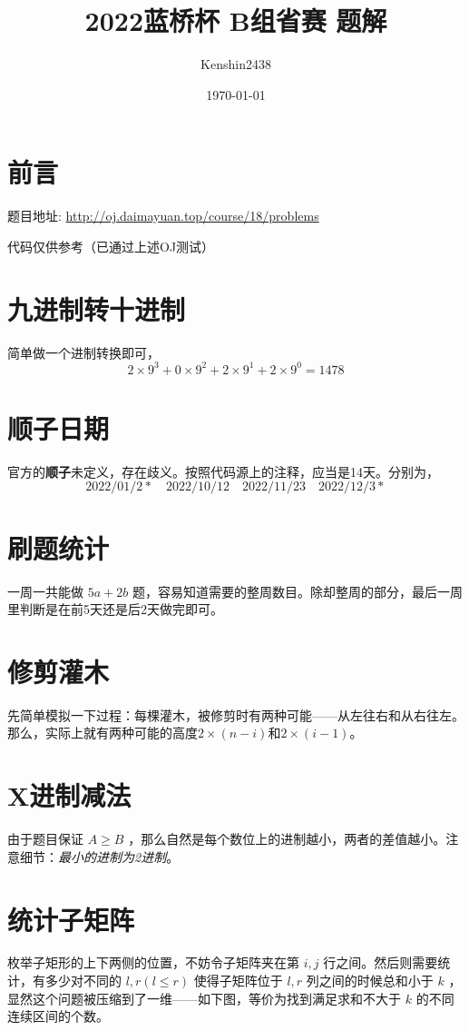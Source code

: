 \documentclass[12pt, a4paper, UTF8]{ctexart}
\title{2022蓝桥杯 B组省赛 题解}
\author{Kenshin2438}
\date{\today}
\newcommand{\cppinput}[1]{
  
}
\begin{document}
\maketitle
\tableofcontents
\newpage

\section*{前言}
题目地址: \url{http://oj.daimayuan.top/course/18/problems}

代码仅供参考（已通过上述OJ测试）

\section{九进制转十进制}
简单做一个进制转换即可，
\[
  2 \times 9^3 + 0 \times 9^2 + 2 \times 9^1 + 2 \times 9^0 = 1478
\]

\section{顺子日期}
官方的\textbf{顺子}未定义，存在歧义。按照代码源上的注释，应当是14天。分别为，
\[
2022/01/2* \quad 2022/10/12 \quad 2022/11/23 \quad 2022/12/3*
\]

\section{刷题统计}
一周一共能做 $5a+2b$ 题，容易知道需要的整周数目。除却整周的部分，最后一周里判断是在前5天还是后2天做完即可。
\cppinput{C.cpp}

\section{修剪灌木}
先简单模拟一下过程：每棵灌木，被修剪时有两种可能——从左往右和从右往左。那么，实际上就有两种可能的高度$2\times(n-i)$和$2\times(i-1)$。
\cppinput{D.cpp}

\section{X进制减法}
由于题目保证 $A \geq B$ ，那么自然是每个数位上的进制越小，两者的差值越小。注意细节：\emph{最小的进制为2进制}。
\cppinput{E.cpp}

\section{统计子矩阵}
枚举子矩形的上下两侧的位置，不妨令子矩阵夹在第 $i,j$ 行之间。然后则需要统计，有多少对不同的 $l,r (l \leq r)$ 使得子矩阵位于 $l,r$ 列之间的时候总和小于 $k$ ，显然这个问题被压缩到了一维——如下图，等价为找到满足求和不大于 $k$ 的不同连续区间的个数。
\end{document}
